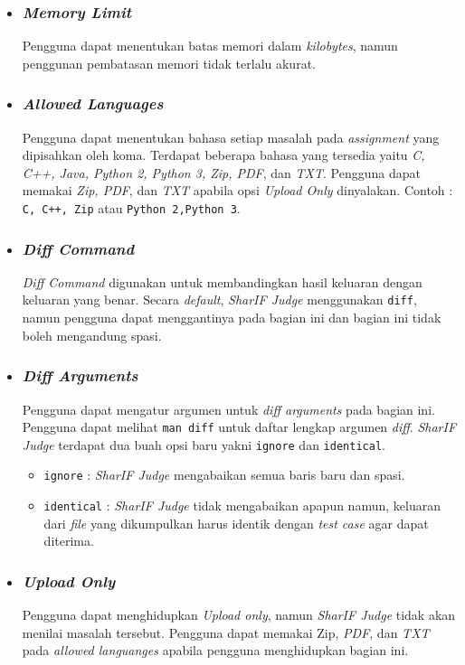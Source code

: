 \begin{itemize}
\item \subsubsection{\textit{Memory Limit}}
Pengguna dapat menentukan batas memori dalam \textit{kilobytes}, namun penggunan pembatasan memori tidak terlalu akurat.

\item \subsubsection{\textit{Allowed Languages}}
Pengguna dapat menentukan bahasa setiap masalah pada \textit{assignment} yang dipisahkan oleh koma. Terdapat beberapa bahasa yang tersedia yaitu \textit{C, C++, Java, Python 2, Python 3, Zip, PDF}, dan \textit{TXT}. Pengguna dapat memakai \textit{Zip, PDF}, dan \textit{TXT} apabila opsi \textit{Upload Only} dinyalakan. Contoh : \texttt{C, C++, Zip} atau \texttt{Python 2,Python 3}.

\item \subsubsection{\textit{Diff Command}}
\textit{Diff Command} digunakan untuk membandingkan hasil keluaran dengan keluaran yang benar. Secara \textit{default}, \textit{SharIF Judge} menggunakan \verb|diff|, namun pengguna dapat menggantinya pada bagian ini dan bagian ini tidak boleh mengandung spasi.

\item \subsubsection{\textit{Diff Arguments}}
Pengguna dapat mengatur argumen untuk \textit{diff arguments} pada bagian ini. Pengguna dapat melihat \verb|man diff| untuk daftar lengkap argumen \textit{diff}. \textit{SharIF Judge} terdapat dua buah opsi baru yakni \verb|ignore| dan \verb|identical|.
\begin{itemize}
\item \verb|ignore| : \textit{SharIF Judge} mengabaikan semua baris baru dan spasi.
\item \verb|identical| : \textit{SharIF Judge} tidak mengabaikan apapun namun, keluaran dari \textit{file} yang dikumpulkan harus identik dengan \textit{test case} agar dapat diterima. 
\end{itemize}

\item \subsubsection{\textit{Upload Only}}
Pengguna dapat menghidupkan \textit{Upload only}, namun \textit{SharIF Judge} tidak akan menilai masalah tersebut. Pengguna dapat memakai Zip, \textit{PDF}, dan \textit{TXT} pada \textit{allowed languanges} apabila pengguna menghidupkan bagian ini.
\end{itemize}

